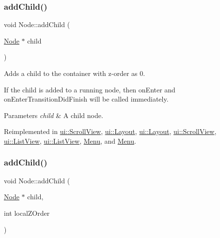 \subsubsection{\texorpdfstring{add\+Child()}{addChild()}\hspace{0.1cm}{\footnotesize\ttfamily [1/8]}}
{\footnotesize\ttfamily void Node\+::add\+Child (\begin{DoxyParamCaption}\item[{\hyperlink{classNode}{Node} $\ast$}]{child }\end{DoxyParamCaption})\hspace{0.3cm}{\ttfamily [virtual]}}

Adds a child to the container with z-\/order as 0.

If the child is added to a \textquotesingle{}running\textquotesingle{} node, then \textquotesingle{}on\+Enter\textquotesingle{} and \textquotesingle{}on\+Enter\+Transition\+Did\+Finish\textquotesingle{} will be called immediately.


\begin{DoxyParams}{Parameters}
{\em child} & A child node. \\
\hline
\end{DoxyParams}


Reimplemented in \hyperlink{classui_1_1ScrollView_a33a556579ca4e24b016a787af18cfcae}{ui\+::\+Scroll\+View}, \hyperlink{classui_1_1Layout_ae08449caf813144448cc3841b1a6dfee}{ui\+::\+Layout}, \hyperlink{classui_1_1Layout_a5d22ede0db71db1d5b597207f1c2013e}{ui\+::\+Layout}, \hyperlink{classui_1_1ScrollView_a6cdee934880e71245c6f5e6a2789c48a}{ui\+::\+Scroll\+View}, \hyperlink{classui_1_1ListView_a7fb7f42f3f3ee9e9ca8ee3bb959e2c32}{ui\+::\+List\+View}, \hyperlink{classui_1_1ListView_aeee2116f21f0e89de5a2e1b9cc93e012}{ui\+::\+List\+View}, \hyperlink{classMenu_af957ef275f6fe75ee78876cbbea924e8}{Menu}, and \hyperlink{classMenu_af557403e8b14bdbda70d85b7d12fedfb}{Menu}.

\mbox{\label{classNode_ad0005bbb94623abd997ce7c3116e6212}} 
\subsubsection{\texorpdfstring{add\+Child()}{addChild()}\hspace{0.1cm}{\footnotesize\ttfamily [2/8]}}
{\footnotesize\ttfamily void Node\+::add\+Child (\begin{DoxyParamCaption}\item[{\hyperlink{classNode}{Node} $\ast$}]{child,  }\item[{int}]{local\+Z\+Order }\end{DoxyParamCaption})\hspace{0.3cm}{\ttfamily [virtual]}}


